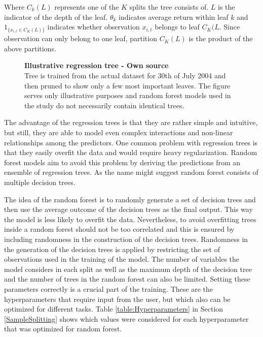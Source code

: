 \documentclass[12pt]{article}
\begin{document}
Where $C_k(L)$ represents one of the $K$ splits the tree consists of. $L$ is the indicator of the depth of the leaf. $\theta_k$ indicates average return within leaf $k$ and $1 _{\{x_{i, t} \in C_K(L)\}}$ indicates whether observation $x_{i, t}$ belongs to leaf $C_K(L$.\footnotemark {}  Since observation can only belong to one leaf, partition $C_K(L)$ is the product of the above partitions. \par

\begin{figure}[ht]
\centering
\caption[Illustrative regression tree]{\textbf{Illustrative regression tree \textnormal{- Own source}}\\ Tree is trained from the actual dataset for 30th of July 2004 and then pruned to show only a few most important leaves. The figure serves only illustrative purposes and random forest models used in the study do not necessarily contain identical trees. }

\label{plot:regre_tree}
\end{figure}

The advantage of the regression trees is that they are rather simple and intuitive, but still, they are able to model even complex interactions and non-linear relationships among the predictors. One common problem with regression trees is that they easily overfit the data and would require heavy regularization. Random forest models aim to avoid this problem by deriving the predictions from an ensemble of regression trees. As the name might suggest random forest consists of multiple decision trees. \par

The idea of the random forest is to randomly generate a set of decision trees and then use the average outcome of the decision trees as the final output. This way the model is less likely to overfit the data. Nevertheless, to avoid overfitting trees inside a random forest should not be too correlated and this is ensured by including randomness in the construction of the decision trees. Randomness in the generation of the decision trees is applied by restricting the set of observations used in the training of the model. The number of variables the model considers in each split as well as the maximum depth of the decision tree and the number of trees in the random forest can also be limited. Setting these parameters correctly is a crucial part of the training. These are the hyperparameters that require input from the user, but which also can be optimized for different tasks. Table \ref{table:Hyperparameters} in Section \ref{SampleSplitting} shows which values were considered for each hyperparameter that was optimized for random forest. \par
\end{document}
